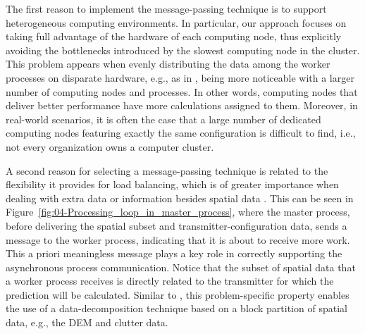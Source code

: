 The first reason to implement the message-passing technique is to
support heterogeneous computing environments. In particular, our approach
focuses on taking full advantage of the hardware of each computing
node, thus explicitly avoiding the bottlenecks introduced by the slowest
computing node in the cluster. This problem appears when evenly distributing
the data among the worker processes on disparate hardware, e.g., as
in \cite{Akhter_Porting_GRASS_raster_module_to_distributed_computing:2007,Huang-Explorations_of_the_implementation_of_a_parallel_IDW_algorithm_in_a_Linux_cluster:2011},
being more noticeable with a larger number of computing nodes and
processes. In other words, computing nodes that deliver better performance
have more calculations assigned to them. Moreover, in real-world scenarios,
it is often the case that a large number of dedicated computing nodes
featuring exactly the same configuration is difficult to find, i.e.,
not every organization owns a computer cluster.

A second reason for selecting a message-passing technique is related
to the flexibility it provides for load balancing, which is of greater
importance when dealing with extra data or information besides spatial
data \cite{Hawick_Distributed_frameworks_and_parallel_algorithms_for_processing_large_scala_geographic_data:2003}.
This can be seen in Figure~\ref{fig:04-Processing_loop_in_master_process},
where the master process, before delivering the spatial subset and
transmitter-configuration data, sends a message to the worker process,
indicating that it is about to receive more work. This a priori meaningless
message plays a key role in correctly supporting the asynchronous
process communication. Notice that the subset of spatial data that
a worker process receives is directly related to the transmitter for
which the prediction will be calculated. Similar to \cite{Tabik-High_performance_three_horizon_composition_algorithm_for_large_scale_terrains:2011,Tabik-Optimal_tilt_and_orientation_maps_a_multi_algorithm_approach_for_heterogeneous_multicore_GPU_systems:2013},
this problem-specific property enables the use of a data-decomposition
technique based on a block partition of spatial data, e.g., the DEM
and clutter data.


